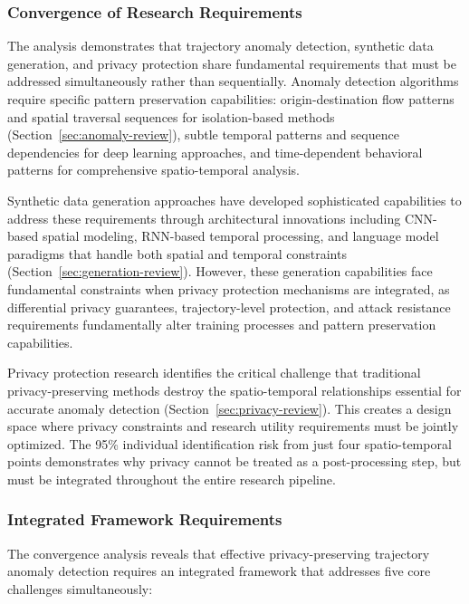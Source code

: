\documentclass[runningheads]{llncs}
\begin{document}
\subsubsection{Convergence of Research Requirements}

The analysis demonstrates that trajectory anomaly detection, synthetic data generation, and privacy protection share fundamental requirements that must be addressed simultaneously rather than sequentially. Anomaly detection algorithms require specific pattern preservation capabilities: origin-destination flow patterns and spatial traversal sequences for isolation-based methods (Section~\ref{sec:anomaly-review}), subtle temporal patterns and sequence dependencies for deep learning approaches, and time-dependent behavioral patterns for comprehensive spatio-temporal analysis.

Synthetic data generation approaches have developed sophisticated capabilities to address these requirements through architectural innovations including CNN-based spatial modeling, RNN-based temporal processing, and language model paradigms that handle both spatial and temporal constraints (Section~\ref{sec:generation-review}). However, these generation capabilities face fundamental constraints when privacy protection mechanisms are integrated, as differential privacy guarantees, trajectory-level protection, and attack resistance requirements fundamentally alter training processes and pattern preservation capabilities.

Privacy protection research identifies the critical challenge that traditional privacy-preserving methods destroy the spatio-temporal relationships essential for accurate anomaly detection (Section~\ref{sec:privacy-review}). This creates a design space where privacy constraints and research utility requirements must be jointly optimized. The 95\% individual identification risk from just four spatio-temporal points demonstrates why privacy cannot be treated as a post-processing step, but must be integrated throughout the entire research pipeline.

\subsubsection{Integrated Framework Requirements}

The convergence analysis reveals that effective privacy-preserving trajectory anomaly detection requires an integrated framework that addresses five core challenges simultaneously:
\end{document}
